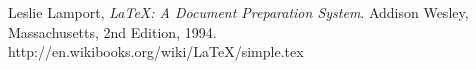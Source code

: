 \documentclass{article}
\begin{document}
\begin{thebibliography}{99}
  Leslie Lamport,
  \emph{\LaTeX: A Document Preparation System}.
  Addison Wesley, Massachusetts,
  2nd Edition,
  1994.
  http://en.wikibooks.org/wiki/LaTeX/simple.tex
\end{thebibliography} %
\end{document}
